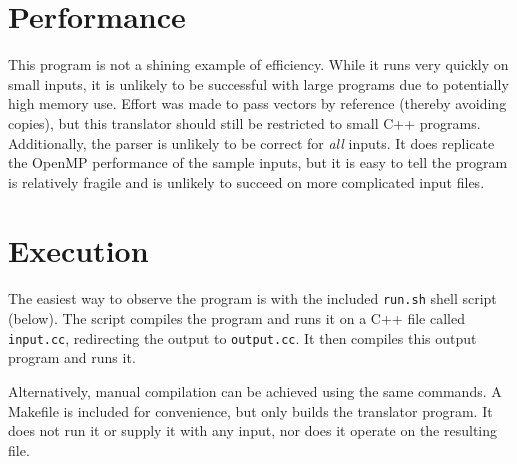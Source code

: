 \documentclass[]{article}
\begin{document}
\section{Performance}
This program is not a shining example of efficiency. While it runs very quickly on small inputs, it is unlikely to be successful with large programs due to potentially high memory use. Effort was made to pass vectors by reference (thereby avoiding copies), but this translator should still be restricted to small C++ programs. Additionally, the parser is unlikely to be correct for \emph{all} inputs. It does replicate the OpenMP performance of the sample inputs, but it is easy to tell the program is relatively fragile and is unlikely to succeed on more complicated input files.

\section{Execution}
The easiest way to observe the program is with the included \texttt{run.sh} shell script (below). The script compiles the program and runs it on a C++ file called \texttt{input.cc}, redirecting the output to \texttt{output.cc}. It then compiles this output program and runs it.


Alternatively, manual compilation can be achieved using the same commands. A Makefile is included for convenience, but only builds the translator program. It does not run it or supply it with any input, nor does it operate on the resulting file.
\end{document}
